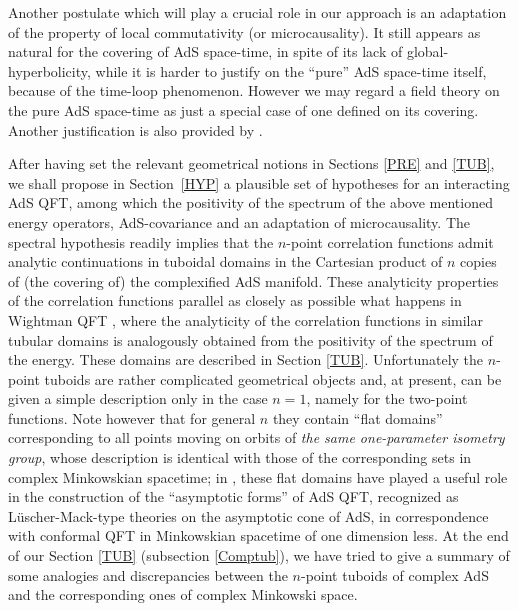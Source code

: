 \documentclass[a4paper,a4paper]{article}
\begin{document}
Another postulate which will play a crucial role in our approach is
an adaptation of the property of local commutativity (or microcausality).
It still appears as natural for
the covering of AdS space-time,
in spite of its lack of global-hyperbolicity,
while it is harder
to justify on the ``pure'' AdS space-time itself, because of the time-loop
phenomenon. However we may
regard a field theory on the pure AdS space-time as just a special case of
one defined on its covering. Another justification is also
provided by \cite{BFS}.


After having set the relevant geometrical notions in Sections
\ref{PRE} and \ref{TUB}, we shall propose in
Section~\ref{HYP} a plausible set of hypotheses
for an interacting AdS QFT, among which the positivity
of the spectrum of the above mentioned energy
operators, AdS-covariance and an adaptation of
microcausality.
The spectral hypothesis
readily implies that
the $n$-point correlation functions admit
analytic continuations in tuboidal
domains in the Cartesian product of $n$ copies of
(the covering of) the complexified AdS manifold.
These analyticity properties of the correlation functions
parallel as closely as possible
what happens in Wightman QFT \cite{SW}, where the analyticity of the
correlation functions in similar tubular domains is analogously
obtained from the positivity of the spectrum of the energy.
These domains are described in Section \ref{TUB}.
Unfortunately the $n$-point tuboids are rather complicated
geometrical objects and, at present, can be given a simple description
only in the case $n = 1$, namely for the two-point functions.
Note however that for general $n$ they contain
``flat domains'' corresponding to all points moving on orbits of {\sl the
same one-parameter isometry group}, whose description is
identical with those of the corresponding
sets in complex Minkowskian spacetime;
in \cite{BBMS}, these flat domains have played a useful
role in the construction of the ``asymptotic forms'' of AdS QFT,
recognized as L\"uscher-Mack-type theories \cite{LM}
on the
asymptotic cone of AdS, in correspondence with conformal QFT
in Minkowskian spacetime of one dimension less.
At the end of our Section \ref{TUB} (subsection \ref{Comptub}), we have
tried to give a summary
of some analogies and discrepancies  between the $n$-point tuboids
of complex AdS and the corresponding ones of complex Minkowski
space.
\end{document}
